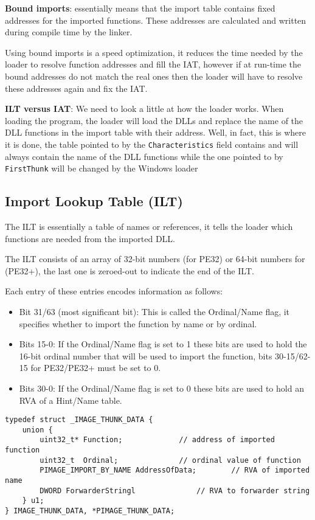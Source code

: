 {\bf Bound imports}: essentially means that the import table contains fixed addresses for the imported functions. These addresses are calculated and written during compile time by the linker.

Using bound imports is a speed optimization, it reduces the time needed by the loader to resolve function addresses and fill the IAT, however if at run-time the bound addresses do not match the real ones then the loader will have to resolve these addresses again and fix the IAT.


{\bf ILT versus IAT}: We need to look a little at how the loader works. When loading the program, the loader will load the DLLs and replace the name of the DLL functions in the import table
with their address. Well, in fact, this is where it is done, the table pointed to by the \verb+Characteristics+ field contains and will always contain the name of the DLL functions while the one pointed to by \verb+FirstThunk+ will be changed by the Windows loader


\subsection{Import Lookup Table (ILT)}

The ILT is essentially a table of names or references, it tells the loader which functions are needed from the imported DLL.

The ILT consists of an array of 32-bit numbers (for PE32) or 64-bit numbers for (PE32+), the last one is zeroed-out to indicate the end of the ILT.

Each entry of these entries encodes information as follows:
\begin{itemize}
    \item Bit 31/63 (most significant bit): This is called the Ordinal/Name flag, it specifies whether to import the function by name or by ordinal.
    \item Bits 15-0: If the Ordinal/Name flag is set to 1 these bits are used to hold the 16-bit ordinal number that will be used to import the function, bits 30-15/62-15 for PE32/PE32+ must be set to 0.
    \item Bits 30-0: If the Ordinal/Name flag is set to 0 these bits are used to hold an RVA of a Hint/Name table.
\end{itemize}

\begin{verbatim}
typedef struct _IMAGE_THUNK_DATA {
    union {
        uint32_t* Function;             // address of imported function
        uint32_t  Ordinal;              // ordinal value of function
        PIMAGE_IMPORT_BY_NAME AddressOfData;        // RVA of imported name
        DWORD ForwarderStringl              // RVA to forwarder string
    } u1;
} IMAGE_THUNK_DATA, *PIMAGE_THUNK_DATA;
\end{verbatim}

